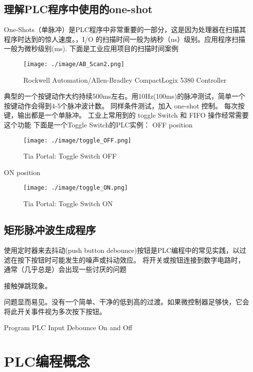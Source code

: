 \documentclass{book}
\begin{document}
\newpage %

	
	\section {理解PLC程序中使用的one-shot}
 
One-Shots（单脉冲）是PLC程序中非常重要的一部分，这是因为处理器在扫描其程序时达到的惊人速度。，I/O 的扫描时间一般为纳秒（us）级别。应用程序扫描一般为微秒级别(ms). 下面是工业应用项目的扫描时间案例
	
		\begin{figure}[ht]
		\centering
		\texttt{[image: ./image/AB\_Scan2.png]}
		\caption{Rockwell Automation/Allen-Bradley CompactLogix 5380 Controller}
		\end{figure}
		
	典型的一个按键动作大约持续500ms左右。用10Hz(100ms)的脉冲测试，简单一个按键动作会得到4-5个脉冲波计数。
同样条件测试，加入 one-shot 控制。 每次按键，输出都是一个单脉冲。	
工业上常用到的 toggle Switch 和 FIFO 操作经常需要这个功能	
\newpage %
下面是一个Toggle Switch的PLC实例：
OFF position
	\begin{figure}[ht]
		\centering
		\texttt{[image: ./image/toggle\_OFF.png]}
		\caption{Tia Portal: Toggle Switch OFF}
	\end{figure}
\newpage %
ON position
	\begin{figure}[ht]
	\centering
	\texttt{[image: ./image/toggle\_ON.png]}
	\caption{Tia Portal: Toggle Switch ON}
	\end{figure}
	
\newpage %
	\section{矩形脉冲波生成程序} %
	使用定时器来去抖动(push button debounce)按钮是PLC编程中的常见实践，以过滤在按下按钮时可能发生的噪声或抖动效应。 
	将开关或按钮连接到数字电路时，通常（几乎总是）会出现一些讨厌的问题
	
	接触弹跳现象。
	
	问题显而易见。没有一个简单、干净的低到高的过渡。如果微控制器足够快，它会将此开关事件视为多次按下按钮。
	
	
	Program PLC Input Debounce On and Off
	
	\chapter{PLC编程概念} %
	
\end{document}
